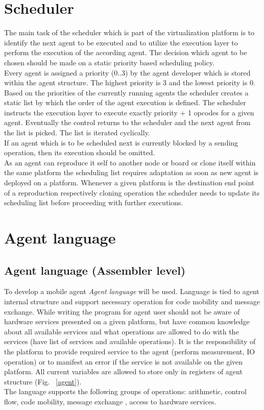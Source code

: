 \documentclass{scrreprt}
\begin{document}
\section{Scheduler}
The main task of the scheduler which is part of the virtualization platform is to identify the next agent to be executed 
and to utilize the execution layer to perform the execution of the according agent. The decision which agent to be chosen 
should be made on a static priority based scheduling policy.
\newline
\\
\noindent
Every agent is assigned a priority (0..3) by the agent developer which is stored within the agent structure. 
The highest priority is 3 and the lowest priority is 0. Based on the priorities of the currently running agents 
the scheduler creates a static list by which the order of the agent execution is defined. The scheduler instructs 
the execution layer to execute exactly priority + 1 opcodes for a given agent. Eventually the control returns to 
the scheduler and the next agent from the list is picked. The list is iterated cyclically.
\newline
\\
\noindent
If an agent which is to be scheduled next is currently blocked by a sending operation, then its execution should be omitted. 
\newline
\\
\noindent
As an agent can reproduce it self to another node or board or clone itself within the same platform the scheduling 
list requires adaptation as soon as new agent is deployed on a platform. Whenever a given platform is the destination 
end point of a reproduction respectively cloning operation the scheduler needs to update its scheduling list before proceeding with further executions.

\section{Agent language}

\subsection{Agent language (Assembler level)}
\noindent
To develop a mobile agent \textit{Agent language} will be used. Language is tied to agent internal structure and support necessary operation for code mobility and message exchange. While writing the program for agent user should not be aware of hardware services presented on a given platform, but have common knowledge about all available services and what operations are allowed to do with the services (have list of services and available operations). It is the responsibility of the platform to provide required service to the agent (perform measurement, IO operation) or to manifest an error if the service is not available on the given platform. All current variables are allowed to store only in registers of agent structure (Fig. ~\ref{agent}).
\\
\noindent
The language supports the following groups of operations: arithmetic, control flow, code mobility, message exchange , access to hardware services.
\end{document}
